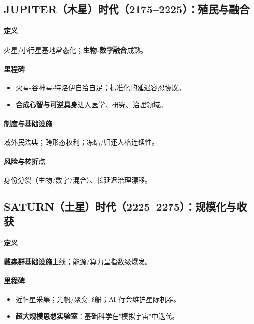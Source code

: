 \documentclass[11pt]{article}
\begin{document}
\subsection{JUPITER（木星）时代（2175–2225）：殖民与融合}
\paragraph{定义} 火星/小行星基地常态化；\textbf{生物-数字融合}成熟。

\paragraph{里程碑}
\begin{itemize}[noitemsep]
  \item 火星-谷神星-特洛伊自给自足；标准化的延迟容忍协议。
  \item \textbf{合成心智与可逆具身}进入医学、研究、治理领域。
\end{itemize}

\paragraph{制度与基础设施} 域外民法典；跨形态权利；冻结/归还人格连续性。

\paragraph{风险与转折点} 身份分裂（生物/数字/混合）、长延迟治理漂移。

\subsection{SATURN（土星）时代（2225–2275）：规模化与收获}
\paragraph{定义} \textbf{戴森群基础设施}上线；能源/算力呈指数级爆发。

\paragraph{里程碑}
\begin{itemize}[noitemsep]
  \item 近恒星采集；光帆/聚变飞船；AI 行会维护星际机器。
  \item \textbf{超大规模思想实验室}：基础科学在"模拟宇宙"中迭代。
\end{itemize}
\end{document}
